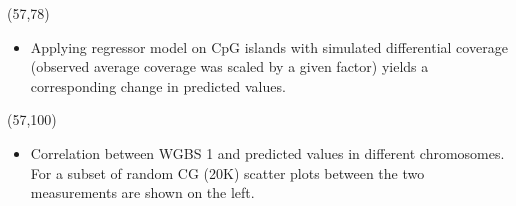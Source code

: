 \documentclass[a0,50pt]{a0poster}
\begin{document}
    \begin{textblock}{25}(57,78)
        \Large
        \begin{itemize}
            \item Applying regressor model on CpG islands with simulated differential coverage (observed average coverage was scaled by a given factor) yields a corresponding change in predicted values.
        \end{itemize}
    \end{textblock}

    \begin{textblock}{25}(57,100)
        \Large
        \begin{itemize}
            \item Correlation between WGBS 1 and predicted values in different chromosomes. For a subset of random CG (20K) scatter plots between the two measurements are shown on the left.
        \end{itemize}
    \end{textblock}
\end{document}
